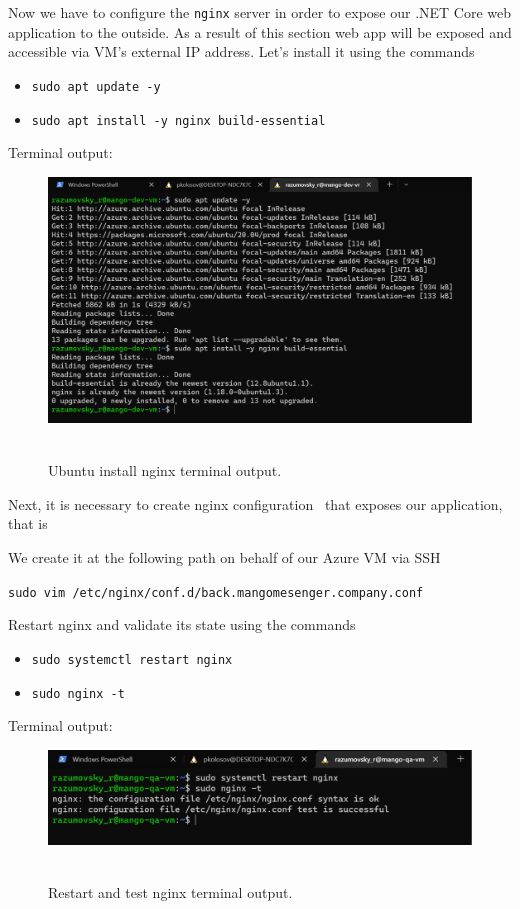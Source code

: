 Now we have to configure the \texttt{nginx} server in order to expose our .NET Core web application to the outside.
As a result of this section web app will be exposed and accessible via VM's external IP address.
Let's install it using the commands
\begin{itemize}
    \item \texttt{sudo apt update -y}
    \item \texttt{sudo apt install -y nginx build-essential}
\end{itemize}
Terminal output:
\begin{figure}[H]
    \centering
    \includegraphics[width=1\textwidth]{img/06_install_nginx}
    ~\caption{Ubuntu install nginx terminal output.}\label{fig:figure15}
\end{figure}
Next, it is necessary to create nginx configuration~\cite{NginxConfig} that exposes our application, that is

We create it at the following path on behalf of our Azure VM via SSH
\begin{center}
    \texttt{sudo vim /etc/nginx/conf.d/back.mangomesenger.company.conf}
\end{center}
Restart nginx and validate its state using the commands
\begin{itemize}
    \item \texttt{sudo systemctl restart nginx}
    \item \texttt{sudo nginx -t}
\end{itemize}
Terminal output:
\begin{figure}[H]
    \centering
    \includegraphics[width=1\textwidth]{img/06_test_nginx}
    ~\caption{Restart and test nginx terminal output.}\label{fig:figure16}
\end{figure}

